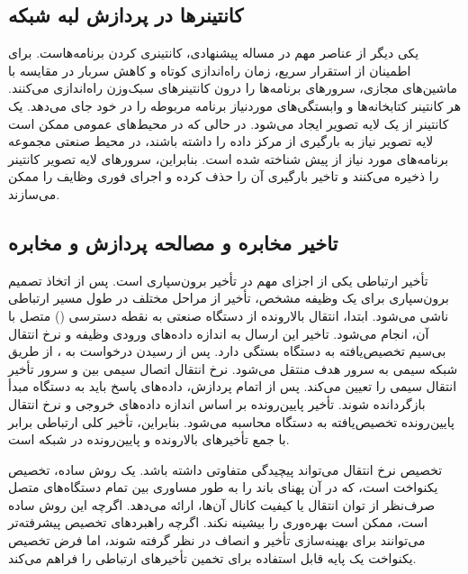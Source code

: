 \subsection{کانتینرها در پردازش لبه شبکه}

یکی دیگر از عناصر مهم در مساله  پیشنهادی، کانتینری کردن برنامه‌هاست. برای اطمینان از استقرار سریع، زمان راه‌اندازی کوتاه و کاهش سربار در مقایسه با ماشین‌های مجازی، سرورهای  برنامه‌ها را درون کانتینرهای سبک‌وزن راه‌اندازی می‌کنند. هر کانتینر کتابخانه‌ها و وابستگی‌های موردنیاز برنامه مربوطه را در خود جای می‌دهد. یک کانتینر از یک لایه تصویر ایجاد می‌شود. در حالی که در محیط‌های  عمومی ممکن است لایه تصویر نیاز به بارگیری از مرکز داده را داشته باشند، در محیط صنعتی مجموعه برنامه‌های مورد نیاز از پیش شناخته شده است. بنابراین، سرورهای  لایه‌ تصویر کانتینر را ذخیره می‌کنند و تاخیر بارگیری آن را حذف کرده و اجرای فوری وظایف را ممکن می‌سازند.

\subsection{تاخیر مخابره و مصالحه پردازش و مخابره}

تأخیر ارتباطی یکی از اجزای مهم در تأخیر برون‌سپاری‌ است. پس از اتخاذ تصمیم برون‌سپاری برای یک وظیفه مشخص، تأخیر از مراحل مختلف در طول مسیر ارتباطی ناشی می‌شود. ابتدا، انتقال بالارونده از دستگاه صنعتی به نقطه دسترسی () متصل با آن، انجام می‌شود. تاخیر این ارسال به اندازه داده‌های ورودی وظیفه و نرخ انتقال بی‌سیم تخصیص‌یافته به دستگاه بستگی دارد. پس از رسیدن درخواست به ، از طریق شبکه سیمی به سرور  هدف منتقل می‌شود. نرخ انتقال اتصال سیمی بین  و سرور  تأخیر انتقال سیمی را تعیین می‌کند. پس از اتمام پردازش، داده‌های پاسخ باید به دستگاه مبدأ بازگردانده شوند. تأخیر پایین‌رونده بر اساس اندازه داده‌های خروجی و نرخ انتقال پایین‌رونده تخصیص‌یافته به دستگاه محاسبه می‌شود. بنابراین، تأخیر کلی ارتباطی برابر با جمع تأخیرهای بالارونده و پایین‌رونده در شبکه است.

تخصیص نرخ انتقال می‌تواند پیچیدگی متفاوتی داشته باشد. یک روش ساده، تخصیص یکنواخت است، که در آن  پهنای باند را به طور مساوری بین تمام دستگاه‌های متصل صرف‌نظر از توان انتقال یا کیفیت کانال آن‌ها، ارائه می‌دهد. اگرچه این روش ساده است، ممکن است بهره‌وری را بیشینه نکند. اگرچه راهبردهای تخصیص پیشرفته‌تر می‌توانند برای بهینه‌سازی تأخیر و انصاف در نظر گرفته شوند، اما فرض تخصیص یکنواخت یک پایه قابل استفاده برای تخمین تأخیرهای ارتباطی را فراهم می‌کند.


